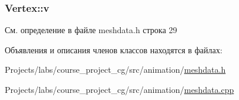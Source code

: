 \subsubsection[{\texorpdfstring{v}{v}}]{ Vertex\+::v\hspace{0.3cm}{\ttfamily [private]}}\hypertarget{class_vertex_a74530e6e784db7cfa08df21c219f4b2b}{}\label{class_vertex_a74530e6e784db7cfa08df21c219f4b2b}


См. определение в файле meshdata.\+h строка 29



Объявления и описания членов классов находятся в файлах\+:\begin{DoxyCompactItemize}
\item 
Projects/labs/course\+\_\+project\+\_\+cg/src/animation/\hyperlink{meshdata_8h}{meshdata.\+h}\item 
Projects/labs/course\+\_\+project\+\_\+cg/src/animation/\hyperlink{meshdata_8cpp}{meshdata.\+cpp}\end{DoxyCompactItemize}
